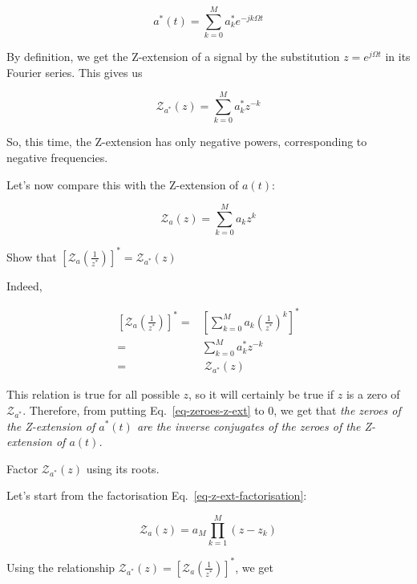 \begin{equation}
a^*(t) = \sum_{k=0}^M a_k^* e^{-jk\Omega t}
\end{equation}

By definition, we get the Z-extension of a signal by the substitution $z=e^{j\Omega t}$ in its Fourier series. This gives us

\begin{equation}
\mathcal{Z}_{a^*}(z) = \sum_{k=0}^M a_k^* z^{-k}
\end{equation}

So, this time, the Z-extension has only negative powers, corresponding to negative frequencies.

Let's now compare this with the Z-extension of $a(t)$:

\begin{equation}
\mathcal{Z}_a(z) = \sum_{k=0}^{M} a_k z^k
\end{equation}

\begin{cue}
Show that $\left[\mathcal{Z}_a\left(\frac{1}{z^*}\right)\right]^* = \mathcal{Z}_{a^*}(z)$
\end{cue}
    
Indeed, 

\begin{align}
    \left[\mathcal{Z}_a\left(\frac{1}{z^*}\right)\right]^* =& \left[ \sum_{k=0}^{M} a_k \left(\frac{1}{z^*}\right)^k \right]^* \nonumber \\
    =& \sum_{k=0}^{M} a_k^* z^{-k} \nonumber \\
    =& \ \mathcal{Z}_{a^*}(z)
    \label{eq-zeroes-z-ext}
\end{align}

This relation is true for all possible $z$, so it will certainly be true if $z$ is a zero of $\mathcal{Z}_{a^*}$. Therefore, from putting Eq.~\ref{eq-zeroes-z-ext} to 0, we get that \emph{the zeroes of the Z-extension of $a^*(t)$ are the inverse conjugates of the zeroes of the Z-extension of $a(t)$. }

\begin{cue}
Factor $\mathcal{Z}_{a^*}(z)$ using its roots.
\end{cue}

Let's start from the factorisation Eq.~\ref{eq-z-ext-factorisation}:

\begin{equation}
\mathcal{Z}_a(z) = a_M \prod_{k=1}^{M} (z-z_k)
\end{equation}

Using the relationship  $\mathcal{Z}_{a^*}(z) = \left[\mathcal{Z}_a\left(\frac{1}{z^*}\right)\right]^*$, we get

